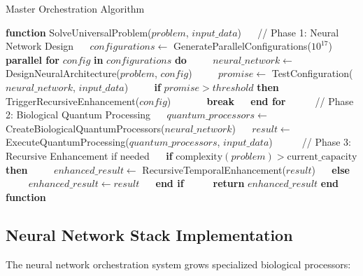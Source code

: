 \documentclass[12pt,a4paper]{article}
\theoremstyle{definition}
\begin{document}
{\begin{algorithm}
\caption{Master Orchestration Algorithm}
\begin{algorithmic}[1]
\STATE \textbf{function} SolveUniversalProblem($problem$, $input\_data$)
\STATE $\quad$ // Phase 1: Neural Network Design
\STATE $\quad$ $configurations \leftarrow$ GenerateParallelConfigurations($10^{17}$)
\STATE $\quad$ \textbf{parallel for} $config$ \textbf{in} $configurations$ \textbf{do}
\STATE $\quad\quad$ $neural\_network \leftarrow$ DesignNeuralArchitecture($problem$, $config$)
\STATE $\quad\quad$ $promise \leftarrow$ TestConfiguration($neural\_network$, $input\_data$)
\STATE $\quad\quad$ \textbf{if} $promise > threshold$ \textbf{then}
\STATE $\quad\quad\quad$ TriggerRecursiveEnhancement($config$)
\STATE $\quad\quad\quad$ \textbf{break}
\STATE $\quad$ \textbf{end for}
\STATE $\quad$
\STATE $\quad$ // Phase 2: Biological Quantum Processing
\STATE $\quad$ $quantum\_processors \leftarrow$ CreateBiologicalQuantumProcessors($neural\_network$)
\STATE $\quad$ $result \leftarrow$ ExecuteQuantumProcessing($quantum\_processors$, $input\_data$)
\STATE $\quad$
\STATE $\quad$ // Phase 3: Recursive Enhancement if needed
\STATE $\quad$ \textbf{if} $\text{complexity}(problem) > \text{current\_capacity}$ \textbf{then}
\STATE $\quad\quad$ $enhanced\_result \leftarrow$ RecursiveTemporalEnhancement($result$)
\STATE $\quad$ \textbf{else}
\STATE $\quad\quad$ $enhanced\_result \leftarrow result$
\STATE $\quad$ \textbf{end if}
\STATE $\quad$
\STATE $\quad$ \textbf{return} $enhanced\_result$
\STATE \textbf{end function}
\end{algorithmic}
\end{algorithm}

\subsection{Neural Network Stack Implementation}

The neural network orchestration system grows specialized biological processors:

}
\end{document}
